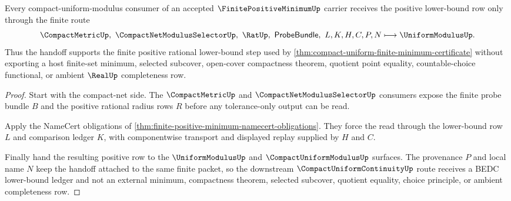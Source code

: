 \begin{theorem}
\label{thm:finite-positive-minimum-compact-uniform-modulus-handoff}
Every compact-uniform-modulus consumer of an accepted $\FinitePositiveMinimumUp$ carrier receives the positive lower-bound row only through the finite route
$$
\CompactMetricUp,\ \CompactNetModulusSelectorUp,\ \RatUp,\ \mathsf{ProbeBundle},\ L,K,H,C,P,N \longmapsto \UniformModulusUp .
$$
Thus the handoff supports the finite positive rational lower-bound step used by \autoref{thm:compact-uniform-finite-minimum-certificate} without exporting a host finite-set minimum, selected subcover, open-cover compactness theorem, quotient point equality, countable-choice functional, or ambient $\RealUp$ completeness row.
\end{theorem}
\begin{proof}
Start with the compact-net side. The $\CompactMetricUp$ and $\CompactNetModulusSelectorUp$ consumers expose the finite probe bundle $B$ and the positive rational radius rows $R$ before any tolerance-only output can be read.

Apply the NameCert obligations of \autoref{thm:finite-positive-minimum-namecert-obligations}. They force the read through the lower-bound row $L$ and comparison ledger $K$, with componentwise transport and displayed replay supplied by $H$ and $C$.

Finally hand the resulting positive row to the $\UniformModulusUp$ and $\CompactUniformModulusUp$ surfaces. The provenance $P$ and local name $N$ keep the handoff attached to the same finite packet, so the downstream $\CompactUniformContinuityUp$ route receives a BEDC lower-bound ledger and not an external minimum, compactness theorem, selected subcover, quotient equality, choice principle, or ambient completeness row.
\end{proof}




